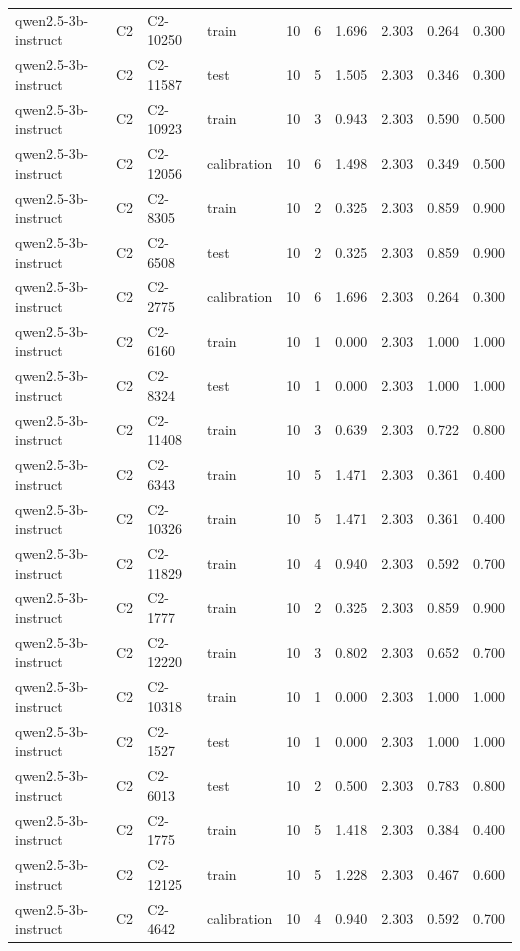 \begin{table}
\begin{tabular}{llllrrrrrr}
qwen2.5-3b-instruct & C2 & C2-10250 & train & 10 & 6 & 1.696 & 2.303 & 0.264 & 0.300 \\
qwen2.5-3b-instruct & C2 & C2-11587 & test & 10 & 5 & 1.505 & 2.303 & 0.346 & 0.300 \\
qwen2.5-3b-instruct & C2 & C2-10923 & train & 10 & 3 & 0.943 & 2.303 & 0.590 & 0.500 \\
qwen2.5-3b-instruct & C2 & C2-12056 & calibration & 10 & 6 & 1.498 & 2.303 & 0.349 & 0.500 \\
qwen2.5-3b-instruct & C2 & C2-8305 & train & 10 & 2 & 0.325 & 2.303 & 0.859 & 0.900 \\
qwen2.5-3b-instruct & C2 & C2-6508 & test & 10 & 2 & 0.325 & 2.303 & 0.859 & 0.900 \\
qwen2.5-3b-instruct & C2 & C2-2775 & calibration & 10 & 6 & 1.696 & 2.303 & 0.264 & 0.300 \\
qwen2.5-3b-instruct & C2 & C2-6160 & train & 10 & 1 & 0.000 & 2.303 & 1.000 & 1.000 \\
qwen2.5-3b-instruct & C2 & C2-8324 & test & 10 & 1 & 0.000 & 2.303 & 1.000 & 1.000 \\
qwen2.5-3b-instruct & C2 & C2-11408 & train & 10 & 3 & 0.639 & 2.303 & 0.722 & 0.800 \\
qwen2.5-3b-instruct & C2 & C2-6343 & train & 10 & 5 & 1.471 & 2.303 & 0.361 & 0.400 \\
qwen2.5-3b-instruct & C2 & C2-10326 & train & 10 & 5 & 1.471 & 2.303 & 0.361 & 0.400 \\
qwen2.5-3b-instruct & C2 & C2-11829 & train & 10 & 4 & 0.940 & 2.303 & 0.592 & 0.700 \\
qwen2.5-3b-instruct & C2 & C2-1777 & train & 10 & 2 & 0.325 & 2.303 & 0.859 & 0.900 \\
qwen2.5-3b-instruct & C2 & C2-12220 & train & 10 & 3 & 0.802 & 2.303 & 0.652 & 0.700 \\
qwen2.5-3b-instruct & C2 & C2-10318 & train & 10 & 1 & 0.000 & 2.303 & 1.000 & 1.000 \\
qwen2.5-3b-instruct & C2 & C2-1527 & test & 10 & 1 & 0.000 & 2.303 & 1.000 & 1.000 \\
qwen2.5-3b-instruct & C2 & C2-6013 & test & 10 & 2 & 0.500 & 2.303 & 0.783 & 0.800 \\
qwen2.5-3b-instruct & C2 & C2-1775 & train & 10 & 5 & 1.418 & 2.303 & 0.384 & 0.400 \\
qwen2.5-3b-instruct & C2 & C2-12125 & train & 10 & 5 & 1.228 & 2.303 & 0.467 & 0.600 \\
qwen2.5-3b-instruct & C2 & C2-4642 & calibration & 10 & 4 & 0.940 & 2.303 & 0.592 & 0.700 \\

\end{tabular}
\end{table}
